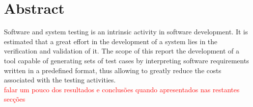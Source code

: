 
\chapter*{Abstract}
\label{ch:abstract}

Software and system testing is an intrinsic activity in software development. It is estimated that a great effort in the development of a system lies in the verification and validation of it. The scope of this report the development of a tool capable of generating sets of test cases by interpreting software requirements written in a predefined format, thus allowing to greatly reduce the costs associated with the testing activities.\\
\textcolor{red}{falar um pouco dos resultados e conclusões quando apresentados nas restantes secções}
